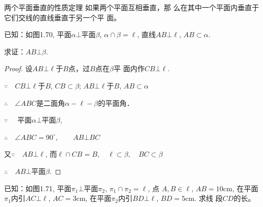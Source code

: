 \begin{blk}
  {两个平面垂直的性质定理} 如果两个平面互相垂直，那
么在其中一个平面内垂直于它们交线的直线垂直于另一个平
面。
\end{blk}

已知：如图1.70, 平面$\alpha\bot $平面$\beta$, 
$\alpha\cap\beta =\ell$, 直线$AB\bot\ell$, $AB\subset\alpha$. 

求证：$AB\bot\beta$.

\begin{proof}
设$AB\bot\ell$于$B$点，过$B$点在$\beta$平
面内作$CB\bot\ell$.

$\because\quad CB\bot\ell$于$B$, $CB\subset \beta$; 
$AB\bot\ell$于$B$, $AB\subset\alpha$

$\therefore\quad \angle ABC$是二面角$\alpha-\ell-\beta$的平面角．

$\because\quad$ 平面$\alpha\bot$平面$\beta$,

$\therefore\quad \angle ABC=90^{\circ},\qquad AB\bot BC$

又$\because\quad AB\bot \ell$, 而$\ell\cap CB=B,\quad \ell\subset \beta,\quad BC\subset \beta$

$\therefore\quad AB\bot$平面$\beta$.
\end{proof}

\begin{example}
  已知：如图1.71, 平面$\pi_1\bot $平面$\pi_2$, $\pi_1\cap \pi_2=\ell$, 点
$A,B\in \ell$, $AB=10$cm, 在平面$\pi_1$内引$AC\bot\ell$, 
$AC=3$cm, 在平面$\pi_2$内引$BD\bot\ell$, $BD=5$cm. 求线
段$CD$的长。
\end{example}

\begin{figure}[htp]
  \centering
{}
  \caption{}
\end{figure}

